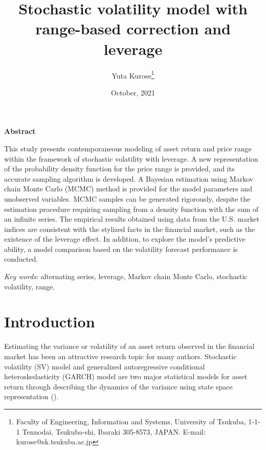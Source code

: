 \documentclass[11pt]{article}
\begin{document}
\allowdisplaybreaks
\baselineskip=20pt

\title{Stochastic volatility model with range-based correction and leverage}

\author{Yuta Kurose\footnote{Faculty of Engineering, Information and Systems, University of Tsukuba, 1-1-1 Tennodai, Tsukuba-shi, Ibaraki 305-8573, JAPAN. E-mail: kurose@sk.tsukuba.ac.jp}}

\date{October, 2021}

\maketitle

\thispagestyle{empty}

\begin{center}
{\bf Abstract}
\end{center}

\noindent
This study presents contemporaneous modeling of asset return and price range within the framework of stochastic volatility with leverage. 
A new representation of the probability density function for the price range is provided, and its accurate sampling algorithm is developed. 
A Bayesian estimation using Markov chain Monte Carlo (MCMC) method is provided for the model parameters and unobserved variables. 
MCMC samples can be generated rigorously, despite the estimation procedure requiring sampling from a density function with the sum of an infinite series. 
The empirical results obtained using data from the U.S. market indices are consistent with the stylized facts in the financial market, such as the existence of the leverage effect. 
In addition, to explore the model's predictive ability, a model comparison based on the volatility forecast performance is conducted. 


\vspace{\baselineskip}

\noindent
{\it Key words}: alternating series, leverage, Markov chain Monte Carlo, stochastic volatility, range.


\newpage
\setcounter{page}{1}
\section{Introduction}
Estimating the variance or volatility of an asset return observed in the financial market has been an attractive research topic for many authors. 
Stochastic volatility (SV) model and generalized autoregressive conditional heteroskedasticity (GARCH) model are two major statistical models for asset return through describing the dynamics of the variance using state space representation (\cite{Bauwens_etal(2012)}). 
\end{document}
